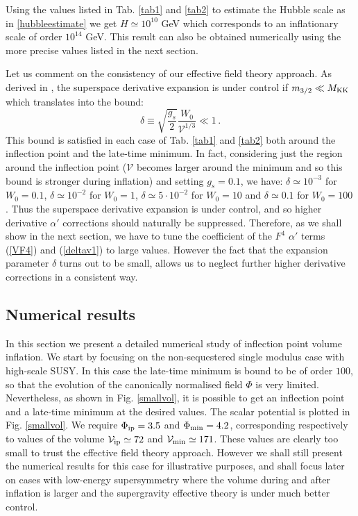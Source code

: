 \documentclass[11pt,a4paper]{article}
\newcommand{\be}{\begin{equation}}
\newcommand{\ee}{\end{equation}}
\newcommand\vo{{\mathcal{V}}}
\begin{document}
Using the values listed in Tab. \ref{tab1} and \ref{tab2} to estimate the Hubble scale as in \eqref{hubbleestimate} we get $H \simeq 10^{10}$ GeV which corresponds to an inflationary scale of order $10^{14}$ GeV. This result can also be obtained numerically using the more precise values listed in the next section.

Let us comment on the consistency of our effective field theory approach. As derived in \cite{Cicoli:2013swa}, the superspace derivative
expansion is under control if $m_{3/2}\ll M_{\rm KK}$ which translates into the bound:
\be
\delta \equiv \sqrt{\frac{g_s}{2}} \frac{W_0}{\vo^{1/3} } \ll 1\,.
\ee
This bound is satisfied in each case of Tab. \ref{tab1} and \ref{tab2} both around the inflection point and the late-time minimum. In fact, considering just the region around the inflection point ($\vo$ becomes larger around the minimum and so this bound is stronger during inflation) and setting $g_s=0.1$, we have: $\delta\simeq 10^{-3}$ for $W_0=0.1$, $\delta\simeq 10^{-2}$ for $W_0=1$, $\delta\simeq5\cdot 10^{-2}$ for $W_0=10$ and $\delta\simeq 0.1$ for $W_0=100$.
Thus the superspace derivative expansion is under control, and so higher derivative $\alpha'$ corrections should naturally be suppressed. Therefore, as we shall show in the next section, we have to tune the coefficient of the $F^4$ $\alpha'$ terms (\ref{VF4}) and (\ref{deltav1}) to large values. However the fact that the expansion parameter $\delta$ turns out to be small, allows us to neglect further higher derivative corrections in a consistent way. 


\subsection{Numerical results}

In this section we present a detailed numerical study of inflection point volume inflation. We start by focusing on the non-sequestered single modulus case with high-scale SUSY. In this case the late-time minimum is bound to be of order $100$, so that the evolution of the canonically normalised field $\Phi$ is very limited. Nevertheless, as shown in Fig. \ref{smallvol}, it is possible to get an inflection point and a late-time minimum at the desired values. The scalar potential is plotted in Fig. \ref{smallvol}. We require $\Phi_{\rm ip} = 3.5$ and $\Phi_{\rm min} = 4.2$, corresponding respectively to values of the volume $\vo_{\rm ip} \simeq 72$ and $\vo_{\rm min} \simeq 171$. These values are clearly too small to trust the effective field theory approach. However we shall still present the numerical results for this case for illustrative purposes, and shall focus later on cases with low-energy supersymmetry where the volume during and after inflation is larger and the supergravity effective theory is under much better control.
\end{document}
